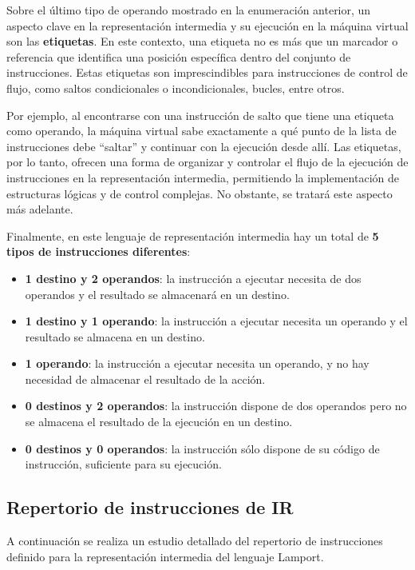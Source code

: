 Sobre el último tipo de operando mostrado en la enumeración anterior, un aspecto clave en la representación intermedia y su ejecución en la máquina virtual son las \textbf{etiquetas}. En este contexto, una etiqueta no es más que un marcador o referencia que identifica una posición específica dentro del conjunto de instrucciones. Estas etiquetas son imprescindibles para instrucciones de control de flujo, como saltos condicionales o incondicionales, bucles, entre otros.



Por ejemplo, al encontrarse con una instrucción de salto que tiene una etiqueta como operando, la máquina virtual sabe exactamente a qué punto de la lista de instrucciones debe ``saltar'' y continuar con la ejecución desde allí. Las etiquetas, por lo tanto, ofrecen una forma de organizar y controlar el flujo de la ejecución de instrucciones en la representación intermedia, permitiendo la implementación de estructuras lógicas y de control complejas. No obstante, se tratará este aspecto más adelante.


Finalmente, en este lenguaje de representación intermedia hay un total de \textbf{5 tipos de instrucciones diferentes}:

\begin{itemize}
    \item \textbf{1 destino y 2 operandos}: la instrucción a ejecutar necesita de dos operandos y el resultado se almacenará en un destino.
    \item \textbf{1 destino y 1 operando}: la instrucción a ejecutar necesita un operando y el resultado se almacena en un destino.
    \item \textbf{1 operando}: la instrucción a ejecutar necesita un operando, y no hay necesidad de almacenar el resultado de la acción.
    \item \textbf{0 destinos y 2 operandos}: la instrucción dispone de dos operandos pero no se almacena el resultado de la ejecución en un destino.
    \item \textbf{0 destinos y 0 operandos}: la instrucción sólo dispone de su código de instrucción, suficiente para su ejecución.
\end{itemize}

\subsection{Repertorio de instrucciones de IR}
A continuación se realiza un estudio detallado del repertorio de instrucciones definido para la representación intermedia del lenguaje Lamport.

